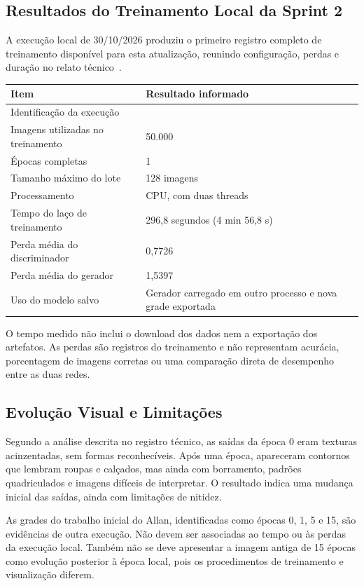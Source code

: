 \documentclass[12pt,a4paper]{article}
\begin{document}
\subsection{Resultados do Treinamento Local da Sprint 2}
\label{sec:resultadosS2}
A execução local de 30/10/2026 produziu o primeiro registro completo de treinamento disponível para esta atualização, reunindo configuração, perdas e duração no relato técnico~\cite{registroS2}.

\begin{center}
\small
\begin{tabularx}{\textwidth}{@{}>{\raggedright\arraybackslash}p{}Y@{}}
\toprule
\textbf{Item} & \textbf{Resultado informado} \\
\midrule
Identificação da execução &  \\
Imagens utilizadas no treinamento & 50.000 \\
Épocas completas & 1 \\
Tamanho máximo do lote & 128 imagens \\
Processamento & CPU, com duas threads \\
Tempo do laço de treinamento & 296,8 segundos (4 min 56,8 s) \\
Perda média do discriminador & 0,7726 \\
Perda média do gerador & 1,5397 \\
Uso do modelo salvo & Gerador carregado em outro processo e nova grade exportada \\
\bottomrule
\end{tabularx}
\end{center}

O tempo medido não inclui o download dos dados nem a exportação dos artefatos. As perdas são registros do treinamento e não representam acurácia, porcentagem de imagens corretas ou uma comparação direta de desempenho entre as duas redes.

\subsection{Evolução Visual e Limitações}
Segundo a análise descrita no registro técnico, as saídas da época 0 eram texturas acinzentadas, sem formas reconhecíveis. Após uma época, apareceram contornos que lembram roupas e calçados, mas ainda com borramento, padrões quadriculados e imagens difíceis de interpretar. O resultado indica uma mudança inicial das saídas, ainda com limitações de nitidez.

As grades do trabalho inicial do Allan, identificadas como épocas 0, 1, 5 e 15, são evidências de outra execução. Não devem ser associadas ao tempo ou às perdas da execução local. Também não se deve apresentar a imagem antiga de 15 épocas como evolução posterior à época local, pois os procedimentos de treinamento e visualização diferem.
\end{document}
